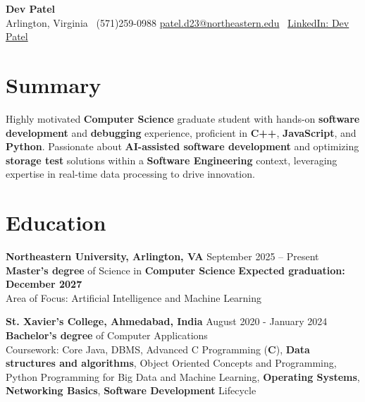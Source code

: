 \documentclass[a4paper,10pt]{article}
\begin{document}
\begin{center}
\vspace{-3mm}
    \fontsize{16}{18}\selectfont \textbf{Dev Patel} \\
    \vspace{0mm}
    \normalsize Arlington, Virginia \textbar\ (571)259-0988  \textbar       \href{mailto:patel.d23@northeastern.edu}{patel.d23@northeastern.edu} \textbar\ \href{https://www.linkedin.com/in/devxpatel//}{LinkedIn: Dev Patel} \\
\end{center}



\section*{Summary}
Highly motivated \textbf{Computer Science} graduate student with hands-on \textbf{software development} and \textbf{debugging} experience, proficient in \textbf{C++}, \textbf{JavaScript}, and \textbf{Python}. Passionate about \textbf{AI-assisted software development} and optimizing \textbf{storage test} solutions within a \textbf{Software Engineering} context, leveraging expertise in real-time data processing to drive innovation.
 
\vspace{ 0 mm}
\section*{Education}
\textbf{Northeastern University, Arlington, VA} \hfill September 2025 -- Present\\
\textbf{Master's degree} of Science in \textbf{Computer Science} \hfill \textbf{Expected graduation: December 2027} \\
Area of Focus: Artificial Intelligence and Machine Learning

\vspace{1 mm} %
\textbf{St. Xavier's College, Ahmedabad, India} \hfill August 2020 - January 2024 \\
\textbf{Bachelor's degree} of Computer Applications\\
Coursework: Core Java, DBMS, Advanced C Programming (\textbf{C}), \textbf{Data structures and algorithms}, Object Oriented Concepts and Programming, Python Programming for Big Data and Machine Learning, \textbf{Operating Systems}, \textbf{Networking Basics}, \textbf{Software Development} Lifecycle
\end{document}
